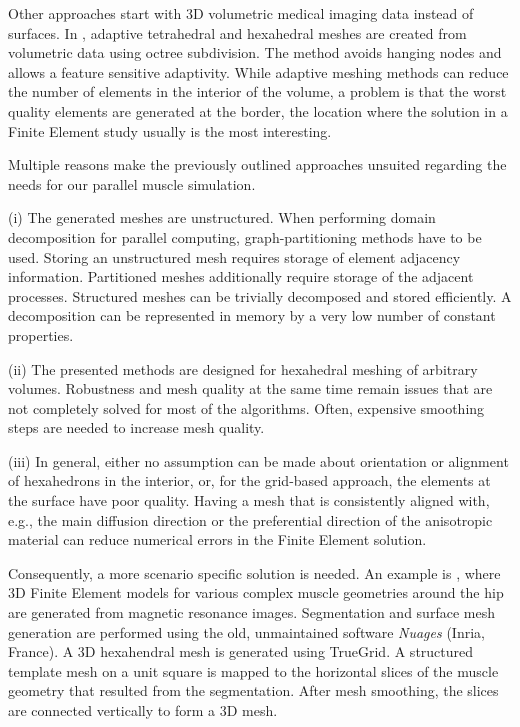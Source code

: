 Other approaches start with 3D volumetric medical imaging data instead of surfaces. In \cite{Zhang2003,Zhang20053DFiniteElementMeshing}, adaptive tetrahedral and hexahedral meshes are created from volumetric data using octree subdivision. The method avoids hanging nodes and allows a feature sensitive adaptivity. While adaptive meshing methods can reduce the number of elements in the interior of the volume, a problem is that the worst quality elements are generated at the border, the location where the solution in a Finite Element study usually is the most interesting.

Multiple reasons make the previously outlined approaches unsuited regarding the needs for our parallel muscle simulation. 

(i) The generated meshes are unstructured. When performing domain decomposition for parallel computing, graph-partitioning methods have to be used. Storing an unstructured mesh requires storage of element adjacency information. Partitioned meshes additionally require storage of the adjacent processes. Structured meshes can be trivially decomposed and stored efficiently. A decomposition can be represented in memory by a very low number of constant properties.

(ii) The presented methods are designed for hexahedral meshing of arbitrary volumes. Robustness and mesh quality at the same time remain issues that are not completely solved for most of the algorithms. Often, expensive smoothing steps are needed to increase mesh quality.

(iii) In general, either no assumption can be made about orientation or alignment of hexahedrons in the interior, or, for the grid-based approach, the elements at the surface have poor quality. Having a mesh that is consistently aligned with, e.g., the main diffusion direction or the preferential direction of the anisotropic material can reduce numerical errors in the Finite Element solution.

Consequently, a more scenario specific solution is needed. An example is \cite{blemker2005three}, where 3D Finite Element models for various complex muscle geometries  around the hip are generated from magnetic resonance images. Segmentation and surface mesh generation are performed using the old, unmaintained software \emph{Nuages} (Inria, France).
A 3D hexahendral mesh is generated using TrueGrid. A structured template mesh on a unit square is mapped to the horizontal slices of the muscle geometry that resulted from the segmentation. After mesh smoothing, the slices are connected vertically to form a 3D mesh. 

